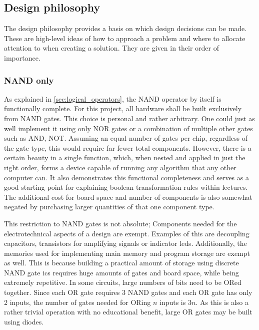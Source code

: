 \subsection{Design philosophy} \label{sec:design_philosophy}

The design philosophy provides a basis on which design decisions can be made. These are high-level ideas of how to approach a problem and where to allocate attention to when creating a solution. They are given in their order of importance.

\subsubsection*{NAND only}

As explained in \autoref{sec:logical_operators}, the NAND operator by itself is functionally complete. For this project, all hardware shall be built exclusively from NAND gates. This choice is personal and rather arbitrary. One could just as well implement it using only NOR gates or a combination of multiple other gates such as AND, NOT. Assuming an equal number of gates per chip, regardless of the gate type, this would require far fewer total components. However, there is a certain beauty in a single function, which, when nested and applied in just the right order, forms a device capable of running any algorithm that any other computer can. It also demonstrates this functional completeness and serves as a good starting point for explaining boolean transformation rules within lectures. The additional cost for board space and number of components is also somewhat negated by purchasing larger quantities of that one component type.

This restriction to NAND gates is not absolute; Components needed for the electrotechnical aspects of a design are exempt. Examples of this are decoupling capacitors, transistors for amplifying signals or indicator \acp{led}. Additionally, the memories used for implementing main memory and program storage are exempt as well. This is because building a practical amount of storage using discrete NAND gate \acp{ic} requires huge amounts of gates and board space, while being extremely repetitive. In some circuits, large numbers of bits need to be ORed together. Since each OR gate requires 3 NAND gates and each OR gate has only 2 inputs, the number of gates needed for ORing $n$ inputs is $3n$. As this is also a rather trivial operation with no educational benefit, large OR gates may be built using diodes.

